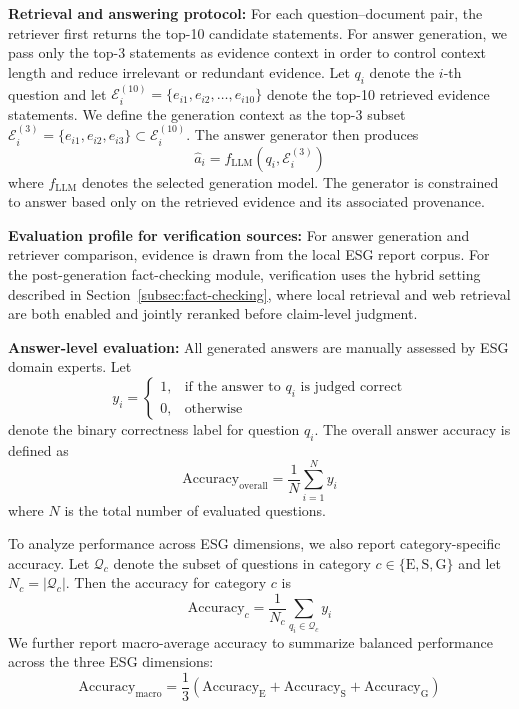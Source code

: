 \documentclass[sn-mathphys, oneside]{sn-jnl}
\begin{document}
\textbf{Retrieval and answering protocol:} For each question--document pair, the retriever first returns the top-10 candidate
statements. For answer generation, we pass only the top-3 statements as evidence
context in order to control context length and reduce irrelevant or redundant evidence.
Let $q_i$ denote the $i$-th question and let
$\mathcal{E}_i^{(10)} = \{e_{i1}, e_{i2}, \ldots, e_{i10}\}$ denote the top-10 retrieved
evidence statements. We define the generation context as the top-3 subset
$\mathcal{E}_i^{(3)} = \{e_{i1}, e_{i2}, e_{i3}\} \subset \mathcal{E}_i^{(10)}$.
The answer generator then produces
\begin{equation}
    \hat{a}_i = f_{\mathrm{LLM}}(q_i, \mathcal{E}_i^{(3)})
    \label{eq:answer_generation}
\end{equation}
where $f_{\mathrm{LLM}}$ denotes the selected generation model. The generator is
constrained to answer based only on the retrieved evidence and its associated provenance.

\textbf{Evaluation profile for verification sources:} For answer generation and retriever comparison, evidence is drawn from the local ESG
report corpus. For the post-generation fact-checking module, verification uses the
hybrid setting described in Section~\ref{subsec:fact-checking}, where local retrieval
and web retrieval are both enabled and jointly reranked before claim-level judgment.

\textbf{Answer-level evaluation:} All generated answers are manually assessed by ESG domain experts. Let
\begin{equation}
    y_i =
    \begin{cases}
        1, & \text{if the answer to } q_i \text{ is judged correct} \\
        0, & \text{otherwise}
    \end{cases}
    \label{eq:binary_correctness}
\end{equation}
denote the binary correctness label for question $q_i$. The overall answer accuracy is
defined as
\begin{equation}
    \mathrm{Accuracy}_{\mathrm{overall}}
    = \frac{1}{N} \sum_{i=1}^{N} y_i
    \label{eq:overall_accuracy}
\end{equation}
where $N$ is the total number of evaluated questions.

To analyze performance across ESG dimensions, we also report category-specific accuracy.
Let $\mathcal{Q}_c$ denote the subset of questions in category
$c \in \{\mathrm{E}, \mathrm{S}, \mathrm{G}\}$ and let $N_c = |\mathcal{Q}_c|$.
Then the accuracy for category $c$ is
\begin{equation}
    \mathrm{Accuracy}_{c}
    = \frac{1}{N_c} \sum_{q_i \in \mathcal{Q}_c} y_i
    \label{eq:category_accuracy}
\end{equation}
We further report macro-average accuracy to summarize balanced performance across the
three ESG dimensions:
\begin{equation}
    \mathrm{Accuracy}_{\mathrm{macro}}
    = \frac{1}{3}
    \left(
    \mathrm{Accuracy}_{\mathrm{E}} +
    \mathrm{Accuracy}_{\mathrm{S}} +
    \mathrm{Accuracy}_{\mathrm{G}}
    \right)
    \label{eq:macro_accuracy}
\end{equation}
\end{document}
